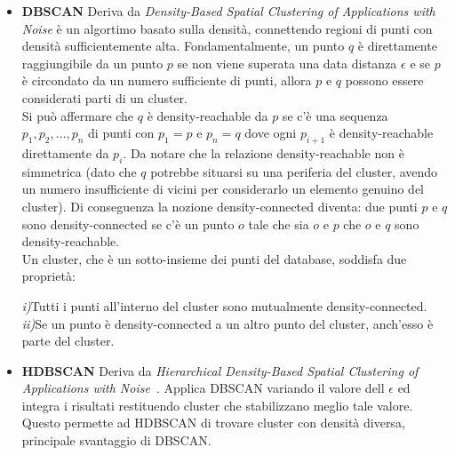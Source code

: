 \begin{itemize}
\item \textbf{DBSCAN}
Deriva da \textit{Density-Based Spatial Clustering of Applications with Noise} è un algortimo basato sulla densità, connettendo regioni di punti con densità sufficientemente alta. Fondamentalmente, un punto $q$  è direttamente raggiungibile da un punto $p$ se non viene superata una data distanza $\epsilon$ e se $p$ è circondato da un numero sufficiente di punti, allora $p$ e $q$ possono essere considerati parti di un cluster. 
\\
Si può affermare che $q$ è density-reachable da $p$ se c'è una sequenza $p_1, p_2,  \ldots, p_n$ di punti con $p_1 = p$ e $p_n = q$ dove ogni $p_{i+1}$ è density-reachable direttamente da $p_i$. Da notare che la relazione density-reachable non è simmetrica (dato che $q$ potrebbe situarsi su una periferia del cluster, avendo un numero insufficiente di vicini per considerarlo un elemento genuino del cluster). Di conseguenza la nozione density-connected diventa: due punti $p$ e $q$ sono density-connected se c'è un punto $o$ tale che sia $o$ e $p$ che $o$ e $q$ sono density-reachable.
\\
Un cluster, che è un sotto-insieme dei punti del database, soddisfa due proprietà:

\textit{i)}Tutti i punti all'interno del cluster sono mutualmente density-connected.
\textit{ii)}Se un punto è density-connected a un altro punto del cluster, anch'esso è parte del cluster.

\item \textbf{HDBSCAN}
Deriva da \textit{Hierarchical Density-Based Spatial Clustering of Applications with Noise}~\cite{Campello15}. Applica DBSCAN variando il valore dell $\epsilon$ ed integra i risultati restituendo cluster che stabilizzano meglio tale valore.
\\
Questo permette ad HDBSCAN di trovare cluster con densità diversa, principale svantaggio di DBSCAN.
\end{itemize}

